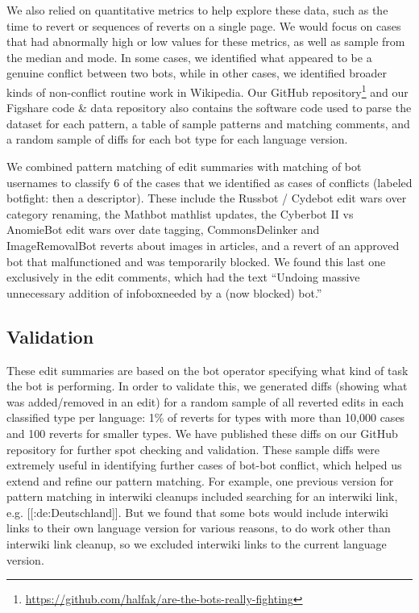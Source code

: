 \documentclass[format=acmsmall, review=false, screen=true]{acmart}%
\begin{document}
We also relied on quantitative metrics to help explore these data, such as the time to revert or sequences of reverts on a single page. We would focus on cases that had abnormally high or low values for these metrics, as well as sample from the median and mode. In some cases, we identified what appeared to be a genuine conflict between two bots, while in other cases, we identified broader kinds of non-conflict routine work in Wikipedia. Our GitHub repository\footnote{ \url{https://github.com/halfak/are-the-bots-really-fighting}} and our Figshare code \& data repository \cite{figshare} also contains the software code used to parse the dataset for each pattern, a table of sample patterns and matching comments, and a random sample of diffs for each bot type for each language version.

We combined pattern matching of edit summaries with matching of bot usernames to classify 6 of the cases that we identified as cases of conflicts (labeled botfight: then a descriptor). These include the Russbot / Cydebot edit wars over category renaming, the Mathbot mathlist updates, the Cyberbot II vs AnomieBot edit wars over date tagging, CommonsDelinker and ImageRemovalBot reverts about images in articles, and a revert of an approved bot that malfunctioned and was temporarily blocked. We found this last one exclusively in the edit comments, which had the text ``Undoing massive unnecessary addition of infoboxneeded by a (now blocked) bot.'' 

\subsection{Validation} \label{s:coding:validation}
These edit summaries are based on the bot operator specifying what kind of task the bot is performing. In order to validate this, we generated diffs (showing what was added/removed in an edit) for a random sample of all reverted edits in each classified type per language: 1\% of reverts for types with more than 10,000 cases and 100 reverts for smaller types. We have published these diffs on our GitHub repository for further spot checking and validation. These sample diffs were extremely useful in identifying further cases of bot-bot conflict, which helped us extend and refine our pattern matching. For example, one previous version for pattern matching in interwiki cleanups included searching for an interwiki link, e.g. [[:de:Deutschland]]. But we found that some bots would include interwiki links to their own language version for various reasons, to do work other than interwiki link cleanup, so we excluded interwiki links to the current language version. 
\end{document}
